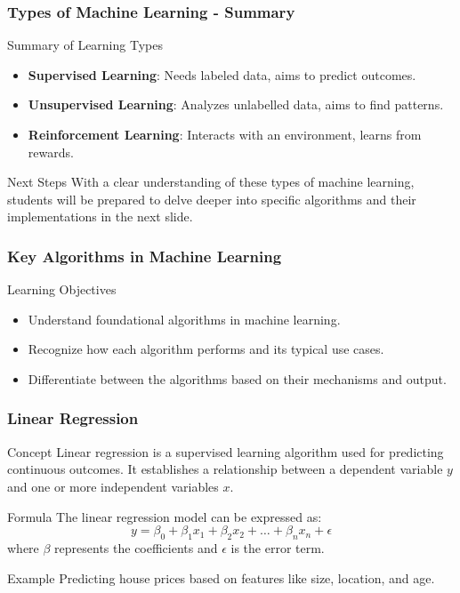 \documentclass[aspectratio=169]{beamer}
\begin{document}
\begin{frame}[fragile]
    \frametitle{Types of Machine Learning - Summary}
    \begin{block}{Summary of Learning Types}
        \begin{itemize}
            \item \textbf{Supervised Learning}: Needs labeled data, aims to predict outcomes.
            \item \textbf{Unsupervised Learning}: Analyzes unlabelled data, aims to find patterns.
            \item \textbf{Reinforcement Learning}: Interacts with an environment, learns from rewards.
        \end{itemize}
    \end{block}
    
    \begin{block}{Next Steps}
        With a clear understanding of these types of machine learning, students will be prepared to delve deeper into specific algorithms and their implementations in the next slide.
    \end{block}
\end{frame}

\begin{frame}[fragile]
    \frametitle{Key Algorithms in Machine Learning}
    \begin{block}{Learning Objectives}
        \begin{itemize}
            \item Understand foundational algorithms in machine learning.
            \item Recognize how each algorithm performs and its typical use cases.
            \item Differentiate between the algorithms based on their mechanisms and output.
        \end{itemize}
    \end{block}
\end{frame}

\begin{frame}[fragile]
    \frametitle{Linear Regression}
    \begin{block}{Concept}
        Linear regression is a supervised learning algorithm used for predicting continuous outcomes. 
        It establishes a relationship between a dependent variable \( y \) and one or more independent variables \( x \).
    \end{block}
    
    \begin{block}{Formula}
        The linear regression model can be expressed as:
        \begin{equation}
            y = \beta_0 + \beta_1x_1 + \beta_2x_2 + \dots + \beta_nx_n + \epsilon
        \end{equation}
        where \( \beta \) represents the coefficients and \( \epsilon \) is the error term.
    \end{block}
    
    \begin{block}{Example}
        Predicting house prices based on features like size, location, and age.
    \end{block}
\end{frame}
\end{document}
